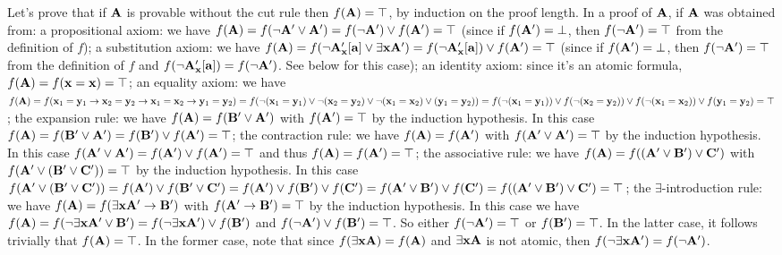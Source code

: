 Let's prove that if ${\bf A}$ is provable without the cut rule then $f({\bf A}) = \top$, by induction on the proof length.
In a proof of ${\bf A}$, if ${\bf A}$ was obtained from:
\itemitem{$\bullet$} a propositional axiom: we have $f({\bf A}) = f(\neg {\bf A}' \lor {\bf A}') = f(\neg {\bf A}') \lor f({\bf A}') = \top$
(since if $f({\bf A}') = \bot$, then $f(\neg {\bf A}') = \top$ from the definition of $f$);
\itemitem{$\bullet$} a substitution axiom: we have 
$f({\bf A}) = f(\neg {\bf A}'_{\bf x}[{\bf a}] \lor \exists {\bf x}{\bf A}') = f(\neg {\bf A}'_{\bf x}[{\bf a}]) \lor f({\bf A}') = \top$ (since 
if $f({\bf A}') = \bot$, then $f(\neg {\bf A}') = \top$ from the definition of $f$ and $f(\neg {\bf A}'_{\bf x}[{\bf a}]) = f(\neg {\bf A}')$. See below for this case);
\itemitem{$\bullet$} an identity axiom: since it's an atomic formula, $f({\bf A}) = f({\bf x} = {\bf x}) = \top$;
\itemitem{$\bullet$} an equality axiom: we have $f({\bf A}) = 
f({\bf x}_1 = {\bf y}_1 \to {\bf x}_2 = {\bf y}_2 \to {\bf x}_1 = {\bf x}_2 \to {\bf y}_1 = {\bf y}_2) =
f(\neg ({\bf x}_1 = {\bf y}_1) \lor \neg ({\bf x}_2 = {\bf y}_2) \lor \neg ({\bf x}_1 = {\bf x}_2) \lor ({\bf y}_1 = {\bf y}_2)) =
f(\neg ({\bf x}_1 = {\bf y}_1)) \lor f(\neg ({\bf x}_2 = {\bf y}_2)) \lor f(\neg ({\bf x}_1 = {\bf x}_2)) \lor f({\bf y}_1 = {\bf y}_2) = \top$;
\itemitem{$\bullet$} the expansion rule: we have $f({\bf A}) = f({\bf B}' \lor {\bf A}')$ with $f({\bf A}') = \top$ by the induction hypothesis.
In this case $f({\bf A}) = f({\bf B}' \lor {\bf A}') = f({\bf B}') \lor f({\bf A}') = \top$;
\itemitem{$\bullet$} the contraction rule: we have $f({\bf A}) = f({\bf A}')$ with $f({\bf A}' \lor {\bf A}') = \top$ by the induction hypothesis. 
In this case $f({\bf A}' \lor {\bf A}') = f({\bf A}') \lor f({\bf A}') = \top$ and thus $f({\bf A}) = f({\bf A}') = \top$;
\itemitem{$\bullet$} the associative rule: we have $f({\bf A}) = f(({\bf A}' \lor {\bf B}') \lor {\bf C}')$ with $f({\bf A}' \lor ({\bf B}' \lor {\bf C}')) = \top$ by the induction hypothesis.
In this case $f({\bf A}' \lor ({\bf B}' \lor {\bf C}')) = f({\bf A}') \lor f({\bf B}' \lor {\bf C}') = f({\bf A}') \lor f({\bf B}') \lor f({\bf C}') =
f({\bf A}' \lor {\bf B}') \lor f({\bf C}') = f(({\bf A}' \lor {\bf B}') \lor {\bf C}') = \top$;
\itemitem{$\bullet$} the $\exists$-introduction rule: we have $f({\bf A}) = f(\exists {\bf x}{\bf A}' \to {\bf B}')$ with $f({\bf A}' \to {\bf B}') = \top$ by the induction hypothesis.
In this case we have $f({\bf A}) = f(\neg \exists {\bf x}{\bf A}' \lor {\bf B}') = f(\neg \exists {\bf x}{\bf A}') \lor f({\bf B}')$ and $f(\neg {\bf A}') \lor f({\bf B}') = \top$.
So either $f(\neg {\bf A}') = \top$ or $f({\bf B}') = \top$. In the latter case, it follows trivially that $f({\bf A}) = \top$. In the former case,
note that since $f(\exists {\bf x}{\bf A}) = f({\bf A})$ and $\exists {\bf x}{\bf A}$ is not atomic, then $f(\neg \exists {\bf x}{\bf A}') = f(\neg {\bf A}')$.


